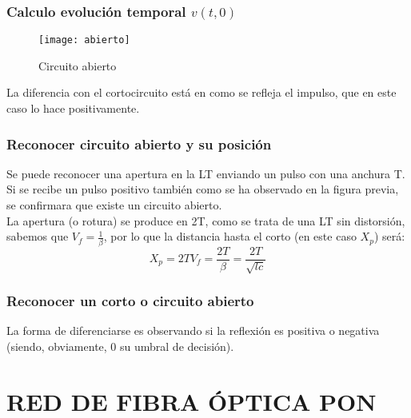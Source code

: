 \documentclass[12pt]{article}
\begin{document}
\subsubsection{Calculo evolución temporal $v(t,0)$}
\begin{figure}[H]
  \centering
    \texttt{[image: abierto]}
  \caption{Circuito abierto}
  \label{fig:abierto}
\end{figure}
La diferencia con el cortocircuito está en como se refleja el impulso, que en este caso lo hace positivamente.
\subsubsection{Reconocer circuito abierto y su posición}
Se puede reconocer una apertura en la LT enviando un pulso con una anchura T. Si se recibe un pulso positivo también como se ha observado en la figura previa, se confirmara que existe un circuito abierto.\\
La apertura (o rotura) se produce en 2T, como se trata de una LT sin distorsión, sabemos que ${V}_{f}=\frac{1}{\beta}$, por lo que la distancia hasta el corto (en este caso ${X}_{p}$) será: 
\begin{displaymath}
{X}_{p} = 2T{V}_{f} = \frac{2T}{\beta}=\frac{2T}{\sqrt{lc}}
\end{displaymath}
\subsubsection{Reconocer un corto o circuito abierto}
La forma de diferenciarse es observando si la reflexión es positiva o negativa (siendo, obviamente, 0 su umbral de decisión).
\section{RED DE FIBRA ÓPTICA PON}
\end{document}
